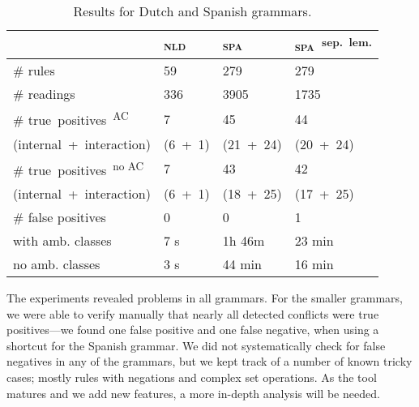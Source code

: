 \begin{table}[]
\centering
\begin{tabular}{|p{2.84cm}|p{1cm}|p{1.15cm}|p{1.55cm}|}

\hline
                   & \textsc{nld}  & \textsc{spa}  & \textsc{spa}~\textsuperscript{sep.~lem.} \\ \hline
\# rules           & 59            & 279       & 279     \\ \hline
\# readings        & 336           & 3905      & 1735    \\ \hline
\# true~positives~\textsuperscript{AC}%
                   & 7             & 45        & 44      \\ 
{\small (internal~+~interaction)}
                   & {\small
                      (6~+~1)}     & {\small 
                                    (21~+~24)} & {\small (20~+~24)} \\ \hline

\# true~positives~\textsuperscript{no AC}  & 7             & 43        & 42      \\ 
{\small (internal~+~interaction)}
                   & {\small
                      (6~+~1)}     & {\small 
                                    (18~+~25)} & {\small (17~+~25)} \\ \hline
\# false positives 
                   & 0             & 0        & 1  \\ \hline

\clock{} with amb. 
           classes & 7 s        & 1h 46m   &  23 min  \\ \hline

\clock{} no amb. 
           classes & 3 s        & 44 min       & 16 min     \\ \hline 


\end{tabular}
\caption{Results for Dutch and Spanish grammars.}
\label{table:res}
\end{table}




The experiments revealed problems in all grammars. For the smaller
grammars, we were able to verify manually that nearly all detected conflicts were
true positives---we found one false positive and one false negative,
when using a shortcut for the Spanish grammar. 
We did not systematically check for false negatives in any of the
grammars, but we kept track of a number of known tricky cases; mostly
rules with negations and complex set operations.
As the tool matures and we add new features, a more in-depth analysis
will be needed.

